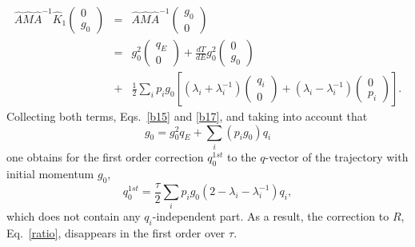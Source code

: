 \documentclass[journal=jpcafh,manuscript=article]{achemso}
\begin{document}
\begin{eqnarray}
  \nonumber
  \hat{A}\hat{M}\hat{A}^{-1}\hat{K}_1\left(\begin{array}{c}0\\g_0\end{array}\right)
  &=&\hat{A}\hat{M}\hat{A}^{-1}\left(\begin{array}{c}g_0\\0\end{array}\right)
  \\
  \label{b17}
  &=&g_0^2\left(\begin{array}{c}q_E\\0\end{array}\right)+\frac{dT}{dE}g_0^2\left(\begin{array}{c}0\\g_0\end{array}\right)
  \\
  \nonumber
  &+&\frac{1}{2}\sum_i p_ig_0\left[(\lambda_i+\lambda_i^{-1})\left(\begin{array}{c}q_i\\0\end{array}\right)
  +(\lambda_i-\lambda_i^{-1})\left(\begin{array}{c}0\\p_i\end{array}\right)\right].
\end{eqnarray}
Collecting both terms, Eqs.~\ref{b15} and \ref{b17}, and taking into
account that
\begin{equation}
  \label{b18}
  g_0=g_0^2q_E+\sum_i(p_ig_0)q_i
\end{equation}
one obtains for the first order correction $q^{1st}_0$ to the
$q$-vector of the trajectory with initial momentum $g_0$,
\begin{equation}
  \label{b19}
  q^{1st}_0=\frac{\tau}{2}\sum_ip_ig_0(2-\lambda_i-\lambda_i^{-1})q_i,
\end{equation}
which does not contain any $q_i$-independent part. As a result, the
correction to $R$, Eq.~\ref{ratio}, disappears in the first order over
$\tau$.
\end{document}
